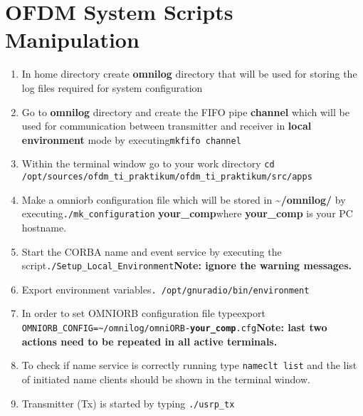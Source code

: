 \section {OFDM System Scripts Manipulation}\label{app:scman}
\begin{enumerate}
	\item In home directory create \textbf{omnilog} directory that will be used for storing the log files required for system configuration
	\item Go to \textbf{omnilog} directory and create the FIFO pipe \textbf{channel} which will be used for communication between transmitter and receiver in \textbf{local environment} mode by executing\newline \texttt{mkfifo channel}
	\item Within the terminal window go to your work directory \newline \texttt{cd /opt/sources/ofdm\_ti\_praktikum/ofdm\_ti\_praktikum/src/apps}
 	\item Make a omniorb configuration file which will be stored in \textbf{\textasciitilde/omnilog/ }by executing\newline \texttt{./mk\_configuration} \textbf{your\_comp}\newline where \textbf{your\_comp} is your PC hostname.
	\item Start the CORBA name and event service by executing the script\newline \texttt{./Setup\_Local\_Environment}\newline \textbf{Note: ignore the warning messages.}
	\item Export environment variables\newline \texttt{. /opt/gnuradio/bin/environment}
	\item In order to set OMNIORB configuration file type\newline export \texttt{OMNIORB\_CONFIG=\textasciitilde/omnilog/omniORB-\textbf{your\_comp}.cfg}\newline \textbf{Note: last two actions need to be repeated in all active terminals.}
	\item To check if name service is correctly running type\newline
	\texttt{nameclt list}\newline
	and the list of initiated name clients should be shown in the terminal window.
	\item Transmitter (Tx) is started by typing\newline 
	\texttt{./usrp\_tx}\newline 

\end{enumerate}
